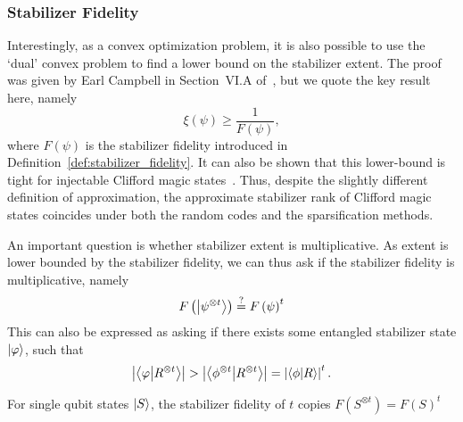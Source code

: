 \subsubsection*{Stabilizer Fidelity}
Interestingly, as a convex optimization problem, it is also possible to use the `dual' convex problem to find a lower bound on the stabilizer extent. The proof was given by Earl Campbell in Section~VI.A of~\cite{Bravyi2018}, but we quote the key result here, namely
\begin{equation}
\xi\left(\psi\right) \geq \frac{1}{F\left(\psi\right)},
\label{eq:extent_fidelity_bound}
\end{equation}
where $F\left(\psi\right)$ is the stabilizer fidelity introduced in Definition~\ref{def:stabilizer_fidelity}. It can also be shown that this lower-bound is tight for injectable Clifford magic states~\cite{Bravyi2018}. Thus, despite the slightly different definition of approximation, the approximate stabilizer rank of Clifford magic states coincides under both the random codes and the sparsification methods.\par
An important question is whether stabilizer extent is multiplicative. As extent is lower bounded by the stabilizer fidelity, we can thus ask if the stabilizer fidelity is multiplicative, namely
\[F\left(\ket{\psi^{\otimes t}}\right) \overset{?}{=} F\left(\psi\right)^{t}\]
This can also be expressed as asking if there exists some entangled stabilizer state $\ket{\varphi}$, such that
\[\left|\braket{\varphi}{R^{\otimes t}}\right|>\left|\braket{\phi^{\otimes t}}{R^{\otimes t}}\right|=\left|\braket{\phi}{R}\right|^{t}.\]
\begin{lem}
For single qubit states $\ket{S}$, the stabilizer fidelity  of $t$ copies $F\left(S^{\otimes t}\right)=F\left(S\right)^{t}$
\label{lem:single_qubit_multiplicative}
\end{lem}
